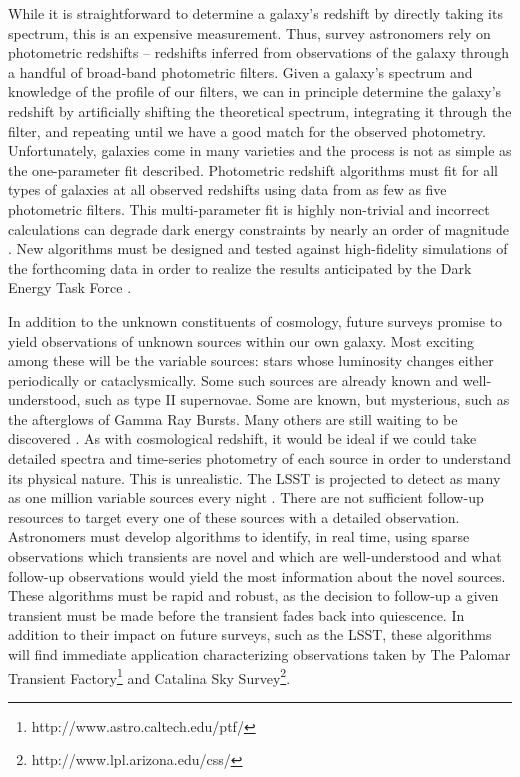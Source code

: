 \documentclass[prd, nofootinbib, floatfix, 12pt,tightenlines]{revtex4}
\begin{document}
While it is straightforward to determine a galaxy's redshift by directly taking
its spectrum, this is an expensive measurement.  
Thus, survey astronomers rely on
photometric redshifts -- redshifts inferred from observations of the galaxy
through a handful of broad-band photometric filters.  Given a
galaxy's spectrum and knowledge of the profile of our filters, we
can in principle determine the galaxy's redshift by artificially shifting the
theoretical spectrum, integrating it through the filter, and repeating until we have a
good match for the observed photometry.  Unfortunately, galaxies come in many
varieties and the process is not as simple as the one-parameter fit described. 
Photometric redshift algorithms must fit for all types of galaxies at all
observed redshifts using data from as few as five photometric
filters.  This
multi-parameter fit is highly non-trivial and incorrect calculations can degrade
dark energy constraints by nearly an order of magnitude \cite{Ma2006}.
New algorithms must be designed and tested against high-fidelity simulations of the
forthcoming data in order to realize the results anticipated by the Dark
Energy Task Force \cite{detf}.  

In addition to the unknown constituents of cosmology, future surveys promise to
yield observations of unknown sources within our own galaxy.  Most exciting
among these will be the variable sources: stars whose luminosity changes either
periodically or cataclysmically.  Some such sources are already known and
well-understood, such as type II supernovae.  
Some are known, but mysterious, such as the afterglows of
Gamma Ray Bursts.
Many others are still waiting to be discovered \cite{sciencebook}.  As with
cosmological redshift, it would be ideal if we could take detailed spectra and
time-series photometry of each source in order to understand its physical
nature.  This is unrealistic.  The LSST is projected to detect as many as one
million variable sources every night \cite{lsstoverview}. 
There are not sufficient follow-up resources to target every one of these
sources with a detailed observation. 
Astronomers must develop algorithms to identify,
in real time, using sparse observations which transients are novel and which are 
well-understood and what follow-up observations would yield the most information
about the novel sources.  These algorithms must be rapid and robust, as the
decision to follow-up a given transient must be made before the transient fades
back into quiescence.  In addition to their impact on future surveys, such as
the LSST, these algorithms will find immediate application characterizing
observations taken by The Palomar Transient
Factory\footnote{http://www.astro.caltech.edu/ptf/} and Catalina Sky
Survey\footnote{http://www.lpl.arizona.edu/css/}.
\end{document}
